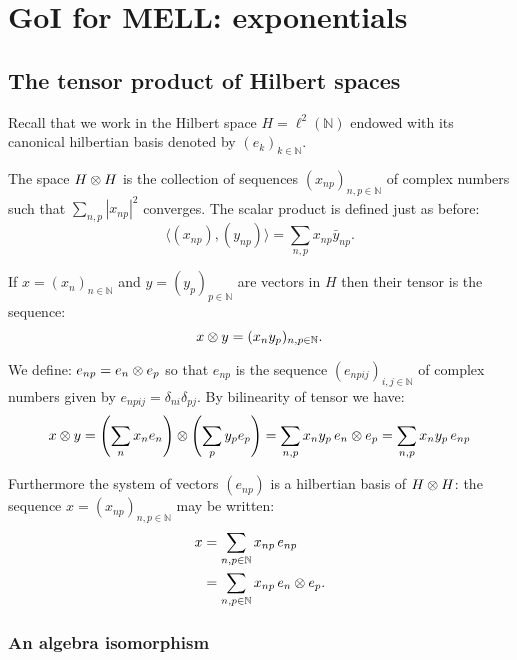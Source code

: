 \section{GoI for MELL: exponentials}\label{goi-for-mell-exponentials}

\subsection{The tensor product of Hilbert spaces}\label{the-tensor-product-of-hilbert-spaces}

Recall that we work in the Hilbert space \(H=\ell^2(\mathbb{N})\)
endowed with its canonical hilbertian basis denoted by
\((e_k)_{k\in\mathbb{N}}\).

The space \(H\otimes H\) is the collection of sequences
\((x_{np})_{n,p\in\mathbb{N}}\) of complex numbers such that
\(\sum_{n,p}|x_{np}|^2\) converges. The scalar product is defined just
as before:
\begin{equation*}
\langle (x_{np}), (y_{np})\rangle = \sum_{n,p} x_{np}\bar y_{np}.
\end{equation*}

If \(x = (x_n)_{n\in\mathbb{N}}\) and \(y = (y_p)_{p\in\mathbb{N}}\) are
vectors in \(H\) then their tensor is the sequence:
\begin{equation*}
x\otimes y = (x_ny_p)_{n,p\in\mathbb{N}}.
\end{equation*}

We define: \(e_{np} = e_n\otimes e_p\) so that \(e_{np}\) is the sequence
\((e_{npij})_{i,j\in\mathbb{N}}\) of complex numbers given by
\(e_{npij} = \delta_{ni}\delta_{pj}\). By bilinearity of tensor we have:
\begin{equation*}
x\otimes y = \left(\sum_n x_n e_n\right)\otimes\left(\sum_p y_p e_p\right) =
\sum_{n,p}x_n y_p\, e_n\otimes e_p = \sum_{n,p} x_n y_p\, e_{np}
\end{equation*}

Furthermore the system of vectors \((e_{np})\) is a hilbertian basis of
\(H\otimes H\): the sequence \(x=(x_{np})_{n,p\in\mathbb{N}}\) may be
written:
\begin{align*}
x &= \sum_{n,p\in\mathbb{N}}x_{np}\,e_{np} \\
  &= \sum_{n,p\in\mathbb{N}}x_{np}\,e_n\otimes e_p
.
\end{align*}

\subsubsection{An algebra isomorphism}\label{an-algebra-isomorphism}

